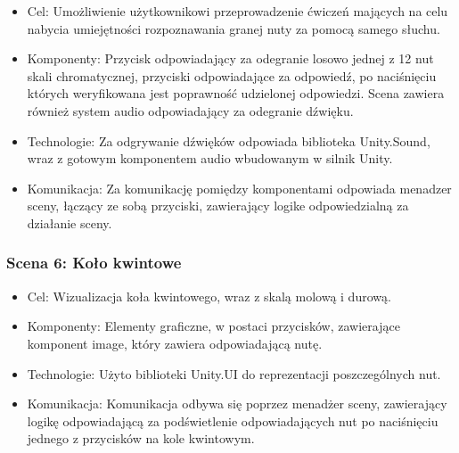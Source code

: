 \begin{itemize}
\item Cel: Umożliwienie użytkownikowi przeprowadzenie ćwiczeń mających na celu nabycia umiejętności rozpoznawania granej nuty za pomocą samego słuchu.
\item Komponenty: Przycisk odpowiadający za odegranie losowo jednej z 12 nut skali chromatycznej, przyciski odpowiadające za odpowiedź, po naciśnięciu których weryfikowana jest poprawność udzielonej odpowiedzi. Scena zawiera również system audio odpowiadający za odegranie dźwięku.
\item Technologie: Za odgrywanie dźwięków odpowiada biblioteka Unity.Sound, wraz z gotowym komponentem audio wbudowanym w silnik Unity.
\item Komunikacja: Za komunikację pomiędzy komponentami odpowiada menadzer sceny, łączący ze sobą przyciski, zawierający logike odpowiedzialną za działanie sceny.
\end{itemize}

\subsubsection{Scena 6: Koło kwintowe}

\begin{itemize}
	\item Cel: Wizualizacja koła kwintowego, wraz z skalą molową i durową.
	\item Komponenty: Elementy graficzne, w postaci przycisków, zawierające komponent image, który zawiera odpowiadającą nutę.
	\item Technologie: Użyto biblioteki Unity.UI do reprezentacji poszczególnych nut.
	\item Komunikacja: Komunikacja odbywa się poprzez menadżer sceny, zawierający logikę odpowiadającą za podświetlenie odpowiadających nut po naciśnięciu jednego z przycisków na kole kwintowym.
\end{itemize}


